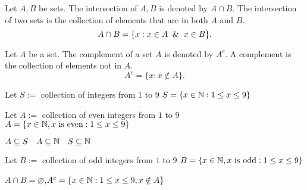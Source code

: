 \documentclass[10pt, a4paper]{article}
\begin{document}
\begin{definition}
    Let $A, B$ be sets. The intersection of $A, B$ is denoted by $A \cap B$. The intersection of two sets is the collection of elements that are in both $A$ and $B$.
    \[
    A \cap B = \{x: x \in A \And x \in B\}.
    \]
\end{definition}

\begin{definition}
    Let $A$ be a set. The complement of a set $A$ is denoted by $A ^ c$. A complement is the collection of elements not in $A$.
    \[
    A ^ c = \{x: x \notin A\}.
    \]
\end{definition}

\begin{example}
    Let $S :=$ collection of integers from $1$ to $9$ 
    $S = \{x \in \mathbb{N}: 1 \leq x \leq 9\}$
    
    Let $A :=$ collection of even integers from $1$ to $9$ 
    $A = \{x \in \mathbb{N}, x \text{ is even}: 1 \leq x \leq 9\}$

    $A \subseteq S\quad A \subseteq \mathbb{N}\quad S\subseteq\mathbb{N}$

    Let $B :=$ collection of odd integers from $1$ to $9$ 
    $B = \{x \in \mathbb{N}, x \text{ is odd}: 1 \leq x \leq 9\}$

    $A \cap B = \varnothing$,\qquad $A ^ c = \{x \in \mathbb{N}: 1\leq x \leq 9, x \notin A\}$
\end{example}
\end{document}
